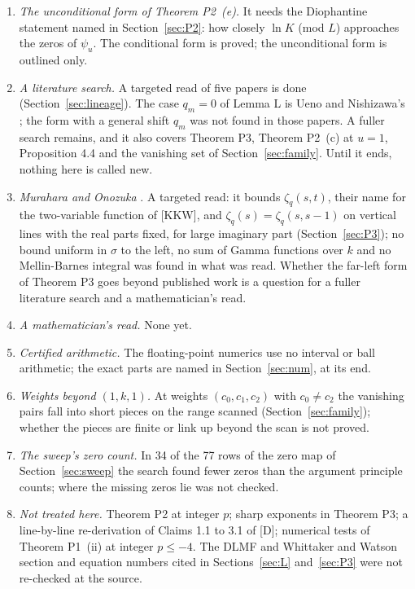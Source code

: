 \documentclass[11pt]{article}
\begin{document}
\begin{enumerate}
\item \emph{The unconditional form of Theorem P2~(e).} It needs the Diophantine statement named in Section~\ref{sec:P2}: how closely $\ln K$ (mod $L$) approaches the zeros of $\psi_u$. The conditional form is proved; the unconditional form is outlined only.
\item \emph{A literature search.} A targeted read of five papers is done (Section~\ref{sec:lineage}). The case $q_m=0$ of Lemma L is Ueno and Nishizawa's \cite{UN}; the form with a general shift $q_m$ was not found in those papers. A fuller search remains, and it also covers Theorem P3, Theorem P2~(c) at $u=1$, Proposition 4.4 and the vanishing set of Section~\ref{sec:family}. Until it ends, nothing here is called new.
\item \emph{Murahara and Onozuka} \cite{MO}. A targeted read: it bounds $\zeta_q(s,t)$, their name for the two-variable function of [KKW], and $\zeta_q(s)=\zeta_q(s,s-1)$ on vertical lines with the real parts fixed, for large imaginary part (Section~\ref{sec:P3}); no bound uniform in $\sigma$ to the left, no sum of Gamma functions over $k$ and no Mellin-Barnes integral was found in what was read. Whether the far-left form of Theorem P3 goes beyond published work is a question for a fuller literature search and a mathematician's read.
\item \emph{A mathematician's read.} None yet.
\item \emph{Certified arithmetic.} The floating-point numerics use no interval or ball arithmetic; the exact parts are named in Section~\ref{sec:num}, at its end.
\item \emph{Weights beyond $(1,k,1)$.} At weights $(c_0,c_1,c_2)$ with $c_0\ne c_2$ the vanishing pairs fall into short pieces on the range scanned (Section~\ref{sec:family}); whether the pieces are finite or link up beyond the scan is not proved.
\item \emph{The sweep's zero count.} In 34 of the 77 rows of the zero map of Section~\ref{sec:sweep} the search found fewer zeros than the argument principle counts; where the missing zeros lie was not checked.
\item \emph{Not treated here.} Theorem P2 at integer $p$; sharp exponents in Theorem P3; a line-by-line re-derivation of Claims 1.1 to 3.1 of [D]; numerical tests of Theorem P1~(ii) at integer $p\le-4$. The DLMF and Whittaker and Watson section and equation numbers cited in Sections~\ref{sec:L} and~\ref{sec:P3} were not re-checked at the source.
\end{enumerate}
\end{document}
